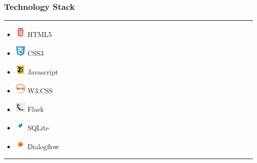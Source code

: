 \documentclass[14pt]{beamer}
\begin{document}
\begin{frame}
    \frametitle{Technology Stack}
    \noindent
    {\color{pink} \rule{\linewidth}{0.7mm} }
    \begin{itemize}
        \item [] \includegraphics[width=0.2in, height=0.2in]{./Codiac/logos/html.png} HTML5 \\
            \pause
        \item [] \includegraphics[width=0.2in, height=0.2in]{./Codiac/logos/css.png} CSS3 \\
            \pause
        \item [] \includegraphics[width=0.2in, height=0.2in]{./Codiac/logos/java.png} Javascript \\
            \pause
        \item [] \includegraphics[width=0.2in, height=0.2in]{./Codiac/logos/w3.png} W3.CSS \\
            \pause
        \item [] \includegraphics[width=0.2in, height=0.2in]{./Codiac/logos/flask.jpg} Flask \\
            \pause
        \item [] \includegraphics[width=0.2in, height=0.2in]{./Codiac/logos/sqllite.png} SQLite \\
            \pause
        \item [] \includegraphics[width=0.2in, height=0.2in]{./Codiac/logos/dialogflow.jpg} Dialogflow \\
    \end{itemize}
\noindent
    {\color{pink} \rule{\linewidth}{0.7mm} }
\end{frame}
\end{document}
